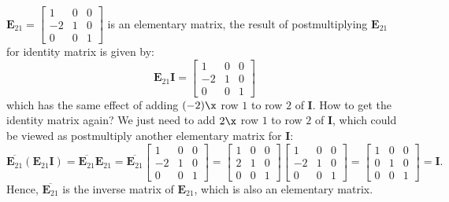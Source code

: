 \begin{example}
$\bm E_{21}=\begin{bmatrix}
1&0&0\\-2&1&0\\0&0&1
\end{bmatrix}$ is an elementary matrix, the result of postmultiplying $\bm E_{21}$ for identity matrix is given by:
\[
\bm E_{21}\bm I=\begin{bmatrix}
1&0&0\\-2&1&0\\0&0&1
\end{bmatrix}
\]
which has the same effect of adding $(-2)\x$ row $1$ to row $2$ of $\bm I$. How to get the identity matrix again? We just need to add $2\x$ row $1$ to row $2$ of $\bm I$, which could be viewed as postmultiply another elementary matrix for $\bm I$:
\[
\overline{\bm E_{21}}(\bm E_{21}\bm I)=\overline{\bm E_{21}}\bm E_{21}=\overline{\bm E_{21}}\begin{bmatrix}
1&0&0\\-2&1&0\\0&0&1
\end{bmatrix}
=\begin{bmatrix}
1&0&0\\2&1&0\\0&0&1
\end{bmatrix}\begin{bmatrix}
1&0&0\\-2&1&0\\0&0&1
\end{bmatrix}
=\begin{bmatrix}
1&0&0\\0&1&0\\0&0&1
\end{bmatrix}=\bm I.
\]
Hence, $\overline{\bm E_{21}}$ is the inverse matrix of $\bm E_{21}$, which is also an elementary matrix.
\end{example}

